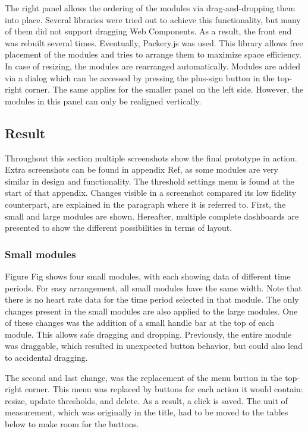         The right panel allows the ordering of the modules via drag-and-dropping them into place. Several libraries were tried out to achieve this functionality, but many of them did not support dragging Web Components. As a result, the front end was rebuilt several times. Eventually, Packery.js was used. This library allows free placement of the modules and tries to arrange them to maximize space efficiency. In case of resizing, the modules are rearranged automatically. Modules are added via a dialog which can be accessed by pressing the plus-sign button in the top-right corner. The same applies for the smaller panel on the left side. However, the modules in this panel can only be realigned vertically.

    \subsection{Result}

    Throughout this section multiple screenshots show the final prototype in action. Extra screenshots can be found in appendix Ref, as some modules are very similar in design and functionality. The threshold settings menu is found at the start of that appendix. Changes visible in a screenshot compared its low fidelity counterpart, are explained in the paragraph where it is referred to. First, the small and large modules are shown. Hereafter, multiple complete dashboards are presented to show the different possibilities in terms of layout.

        \subsubsection{Small modules}

        Figure Fig shows four small modules, with each showing data of different time periods. For easy arrangement, all small modules have the same width. Note that there is no heart rate data for the time period selected in that module. The only changes present in the small modules are also applied to the large modules. One of these changes was the addition of a small handle bar at the top of each module. This allows safe dragging and dropping. Previously, the entire module was draggable, which resulted in unexpected button behavior, but could also lead to accidental dragging.

        The second and last change, was the replacement of the menu button in the top-right corner. This menu was replaced by buttons for each action it would contain: resize, update thresholds, and delete. As a result, a click is saved. The unit of measurement, which was originally in the title, had to be moved to the tables below to make room for the buttons.

